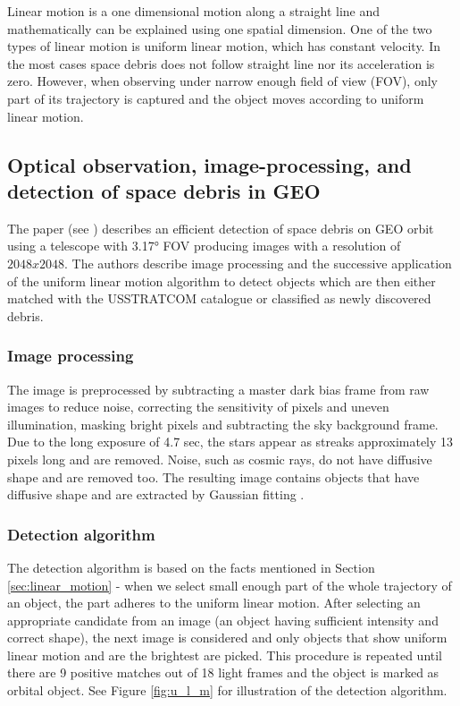 	Linear motion is a one dimensional motion along a straight line and mathematically can be explained using one spatial dimension. One of the two types of linear motion is uniform linear motion, which has constant velocity. In the most cases space debris does not follow straight line nor its acceleration is zero. However, when observing under narrow enough field of view (FOV), only part of its trajectory is captured and the object moves according to uniform linear motion.

\subsection{Optical observation, image-processing, and detection of space debris in GEO}\label{subsec:linear_geo}

	The paper (see \citep{oda}) describes an efficient detection of space debris on GEO orbit using a telescope with 3.17° FOV producing images with a resolution of $2048 x 2048$. The authors describe image processing and the successive application of the uniform linear motion algorithm to detect objects which are then either matched with the USSTRATCOM catalogue or classified as newly discovered debris.
	
\subsubsection{Image processing}

	The image is preprocessed by subtracting a master dark bias frame from raw images to reduce noise, correcting the sensitivity of pixels and uneven illumination, masking bright pixels and subtracting the sky background frame. Due to the long exposure of 4.7 sec, the stars appear as streaks approximately 13 pixels long and are removed. Noise, such as cosmic rays, do not have diffusive shape and are removed too. The resulting image contains objects that have diffusive shape and are extracted by Gaussian fitting \citep{oda}.
	
\subsubsection{Detection algorithm}

	The detection algorithm is based on the facts mentioned in Section \ref{sec:linear_motion} - when we select small enough part of the whole trajectory of an object, the part adheres to the uniform linear motion. After selecting an appropriate candidate from an image (an object having sufficient intensity and correct shape), the next image is considered and only objects that show uniform linear motion and are the brightest are picked. This procedure is repeated until there are 9 positive matches out of 18 light frames and the object is marked as orbital object. See Figure \ref{fig:u_l_m} for illustration of the detection algorithm.
	
